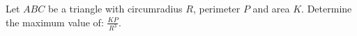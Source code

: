 Let $ ABC$ be a triangle with circumradius $ R$,  perimeter $ P$ and area $ K$. Determine the maximum value of: $ \frac{KP}{R^3}$.